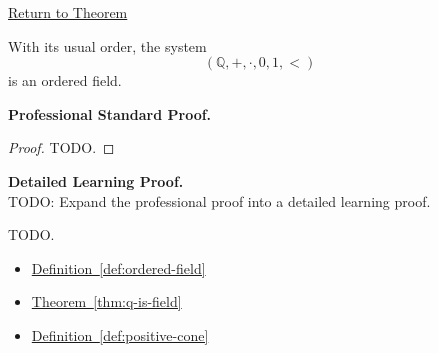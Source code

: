 \newpage
{}
\label{prf:q-is-ordered-field}

\begin{remark*}[Return]
\hyperref[thm:q-is-ordered-field]{Return to Theorem}
\end{remark*}

\begin{theorem*}
With its usual order, the system
\[
(\mathbb{Q},+,\cdot,0,1,<)
\]
is an ordered field.
\end{theorem*}

\textbf{Professional Standard Proof.}~\\
\begin{proof}
TODO.
\end{proof}

\textbf{Detailed Learning Proof.}~\\
TODO: Expand the professional proof into a detailed learning proof.


\begin{remark*}
TODO.
\end{remark*}

\begin{dependencies}
\begin{itemize}
  \item \hyperref[def:ordered-field]{Definition~\ref*{def:ordered-field}}
  \item \hyperref[thm:q-is-field]{Theorem~\ref*{thm:q-is-field}}
  \item \hyperref[def:positive-cone]{Definition~\ref*{def:positive-cone}}
\end{itemize}
\end{dependencies}
